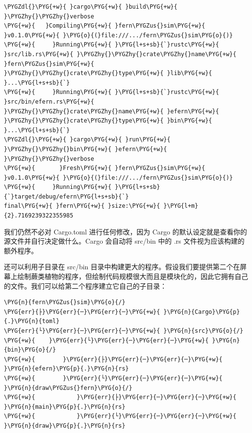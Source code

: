 \begin{Verbatim}[commandchars=\\\{\},breaklines=true,breakanywhere=true,fontsize=\codefont,xleftmargin=17bp]
\PYGZdl{}\PYG{+w}{ }cargo\PYG{+w}{ }build\PYG{+w}{ }\PYGZhy{}\PYGZhy{}verbose
\PYG{+w}{   }Compiling\PYG{+w}{ }fern\PYGZus{}sim\PYG{+w}{ }v0.1.0\PYG{+w}{ }\PYG{o}{(}file:///.../fern\PYGZus{}sim\PYG{o}{)}
\PYG{+w}{     }Running\PYG{+w}{ }\PYG{l+s+sb}{`}rustc\PYG{+w}{ }src/lib.rs\PYG{+w}{ }\PYGZhy{}\PYGZhy{}crate\PYGZhy{}name\PYG{+w}{ }fern\PYGZus{}sim\PYG{+w}{ }\PYGZhy{}\PYGZhy{}crate\PYGZhy{}type\PYG{+w}{ }lib\PYG{+w}{ }...\PYG{l+s+sb}{`}
\PYG{+w}{     }Running\PYG{+w}{ }\PYG{l+s+sb}{`}rustc\PYG{+w}{ }src/bin/efern.rs\PYG{+w}{ }\PYGZhy{}\PYGZhy{}crate\PYGZhy{}name\PYG{+w}{ }efern\PYG{+w}{ }\PYGZhy{}\PYGZhy{}crate\PYGZhy{}type\PYG{+w}{ }bin\PYG{+w}{ }...\PYG{l+s+sb}{`}
\PYGZdl{}\PYG{+w}{ }cargo\PYG{+w}{ }run\PYG{+w}{ }\PYGZhy{}\PYGZhy{}bin\PYG{+w}{ }efern\PYG{+w}{ }\PYGZhy{}\PYGZhy{}verbose
\PYG{+w}{       }Fresh\PYG{+w}{ }fern\PYGZus{}sim\PYG{+w}{ }v0.1.0\PYG{+w}{ }\PYG{o}{(}file:///.../fern\PYGZus{}sim\PYG{o}{)}
\PYG{+w}{     }Running\PYG{+w}{ }\PYG{l+s+sb}{`}target/debug/efern\PYG{l+s+sb}{`}
final\PYG{+w}{ }fern\PYG{+w}{ }size:\PYG{+w}{ }\PYG{l+m}{2}.7169239322355985
\end{Verbatim}

我们仍然不必对 Cargo.toml 进行任何修改，因为 Cargo 的默认设定就是查看你的源文件并自行决定做什么。Cargo 会自动将 src/bin 中的 .rs 文件视为应该构建的额外程序。

还可以利用子目录在 src/bin 目录中构建更大的程序。假设我们要提供第二个在屏幕上绘制蕨类植物的程序，但绘制代码规模很大而且是模块化的，因此它拥有自己的文件。我们可以给第二个程序建立它自己的子目录：

\begin{Verbatim}[commandchars=\\\{\},breaklines=true,breakanywhere=true,fontsize=\codefont,xleftmargin=17bp]
\PYG{n}{fern\PYGZus{}sim}\PYG{o}{/}
\PYG{err}{├}\PYG{err}{─}\PYG{err}{─}\PYG{+w}{ }\PYG{n}{Cargo}\PYG{p}{.}\PYG{n}{toml}
\PYG{err}{└}\PYG{err}{─}\PYG{err}{─}\PYG{+w}{ }\PYG{n}{src}\PYG{o}{/}
\PYG{+w}{    }\PYG{err}{└}\PYG{err}{─}\PYG{err}{─}\PYG{+w}{ }\PYG{n}{bin}\PYG{o}{/}
\PYG{+w}{        }\PYG{err}{├}\PYG{err}{─}\PYG{err}{─}\PYG{+w}{ }\PYG{n}{efern}\PYG{p}{.}\PYG{n}{rs}
\PYG{+w}{        }\PYG{err}{└}\PYG{err}{─}\PYG{err}{─}\PYG{+w}{ }\PYG{n}{draw\PYGZus{}fern}\PYG{o}{/}
\PYG{+w}{            }\PYG{err}{├}\PYG{err}{─}\PYG{err}{─}\PYG{+w}{ }\PYG{n}{main}\PYG{p}{.}\PYG{n}{rs}
\PYG{+w}{            }\PYG{err}{└}\PYG{err}{─}\PYG{err}{─}\PYG{+w}{ }\PYG{n}{draw}\PYG{p}{.}\PYG{n}{rs}
\end{Verbatim}


